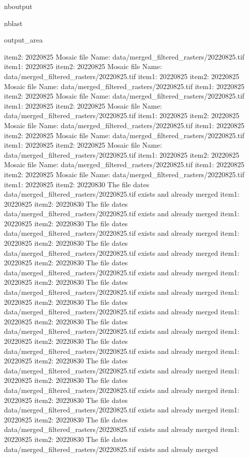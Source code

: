 \documentclass[letterpaper,10pt]{sphinxmanual}
\begin{document}
\begin{sphinxuseclass}{nboutput}
\begin{sphinxuseclass}{nblast}
{\begin{sphinxuseclass}{output_area}
\begin{sphinxuseclass}{}
\begin{sphinxVerbatim}[commandchars=\\\{\}]
item2:  20220825
Mosaic file Name:  data/merged\_filtered\_rasters/20220825.tif
item1:  20220825
item2:  20220825
Mosaic file Name:  data/merged\_filtered\_rasters/20220825.tif
item1:  20220825
item2:  20220825
Mosaic file Name:  data/merged\_filtered\_rasters/20220825.tif
item1:  20220825
item2:  20220825
Mosaic file Name:  data/merged\_filtered\_rasters/20220825.tif
item1:  20220825
item2:  20220825
Mosaic file Name:  data/merged\_filtered\_rasters/20220825.tif
item1:  20220825
item2:  20220825
Mosaic file Name:  data/merged\_filtered\_rasters/20220825.tif
item1:  20220825
item2:  20220825
Mosaic file Name:  data/merged\_filtered\_rasters/20220825.tif
item1:  20220825
item2:  20220825
Mosaic file Name:  data/merged\_filtered\_rasters/20220825.tif
item1:  20220825
item2:  20220825
Mosaic file Name:  data/merged\_filtered\_rasters/20220825.tif
item1:  20220825
item2:  20220825
Mosaic file Name:  data/merged\_filtered\_rasters/20220825.tif
item1:  20220825
item2:  20220830
The file dates data/merged\_filtered\_rasters/20220825.tif exists and already merged
item1:  20220825
item2:  20220830
The file dates data/merged\_filtered\_rasters/20220825.tif exists and already merged
item1:  20220825
item2:  20220830
The file dates data/merged\_filtered\_rasters/20220825.tif exists and already merged
item1:  20220825
item2:  20220830
The file dates data/merged\_filtered\_rasters/20220825.tif exists and already merged
item1:  20220825
item2:  20220830
The file dates data/merged\_filtered\_rasters/20220825.tif exists and already merged
item1:  20220825
item2:  20220830
The file dates data/merged\_filtered\_rasters/20220825.tif exists and already merged
item1:  20220825
item2:  20220830
The file dates data/merged\_filtered\_rasters/20220825.tif exists and already merged
item1:  20220825
item2:  20220830
The file dates data/merged\_filtered\_rasters/20220825.tif exists and already merged
item1:  20220825
item2:  20220830
The file dates data/merged\_filtered\_rasters/20220825.tif exists and already merged
item1:  20220825
item2:  20220830
The file dates data/merged\_filtered\_rasters/20220825.tif exists and already merged
item1:  20220825
item2:  20220830
The file dates data/merged\_filtered\_rasters/20220825.tif exists and already merged
item1:  20220825
item2:  20220830
The file dates data/merged\_filtered\_rasters/20220825.tif exists and already merged
item1:  20220825
item2:  20220830
The file dates data/merged\_filtered\_rasters/20220825.tif exists and already merged
item1:  20220825
item2:  20220830
The file dates data/merged\_filtered\_rasters/20220825.tif exists and already merged

\end{sphinxVerbatim}
\end{sphinxuseclass}
\end{sphinxuseclass}}
\end{sphinxuseclass}
\end{sphinxuseclass}
\end{document}

